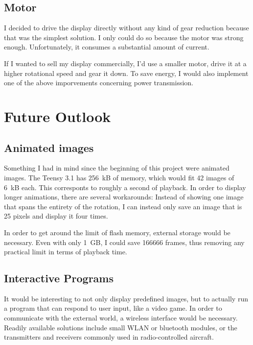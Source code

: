 \documentclass[a4paper, 11pt, titlepage]{report}
\begin{document}
\subsection{Motor}

I decided to drive the display directly without any kind of gear reduction because that was the
simplest solution. I only could do so because the motor was strong enough. Unfortunately, it
consumes a substantial amount of current.

If I wanted to sell my display commercially, I'd use a smaller motor, drive it at a higher
rotational speed and gear it down. To save energy, I would also implement one of the above
imporvements concerning power transmission.


\section{Future Outlook}

\subsection{Animated images}

Something I had in mind since the beginning of this project were animated images. The Teensy 3.1
has \SI{256}{kB} of memory, which would fit 42 images of \SI{6}{kB} each. This
corresponts to roughly a second of playback. In order to display longer animations, there are
several workarounds: Instead of showing one image that spans the entirety of the rotation, I can
instead only save an image that is 25 pixels and display it four times.

In order to get around the limit of flash memory, external storage would be necessary. Even with
only \SI{1}{GB}, I could save 166666 frames, thus removing any practical limit in terms of
playback time.

\subsection{Interactive Programs}

It would be interesting to not only display predefined images, but to actually run a program that
can respond to user input, like a video game. In order to communicate with the external world, a
wireless interface would be necessary. Readily available solutions include small WLAN or bluetooth
modules, or the transmitters and receivers commonly used in radio-controlled aircraft.
\end{document}
